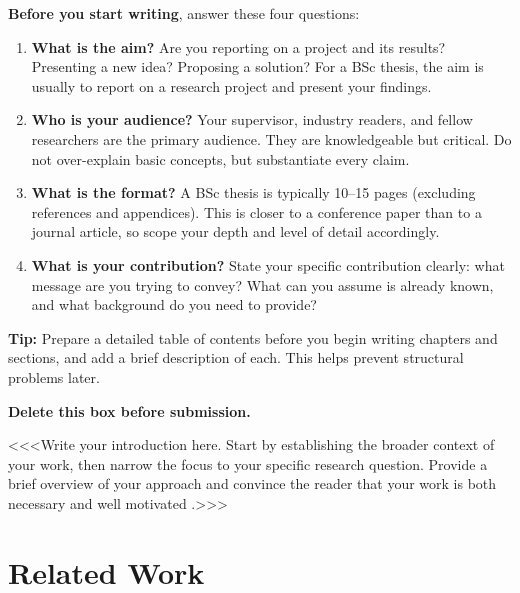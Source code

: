 \documentclass[12pt,a4paper,twocolumn]{article}
\begin{document}
\begin{stylenote}
\textbf{Before you start writing}, answer these four questions:
\begin{enumerate}[leftmargin=*, nosep]
  \item \textbf{What is the aim?} Are you reporting on a project and its
    results? Presenting a new idea? Proposing a solution? For a BSc thesis,
    the aim is usually to report on a research project and present your findings.
  \item \textbf{Who is your audience?} Your supervisor, industry readers,
    and fellow researchers are the primary audience. They are knowledgeable
    but critical. Do not over-explain basic concepts, but substantiate every claim.
  \item \textbf{What is the format?} A BSc thesis is typically 10--15 pages
    (excluding references and appendices). This is closer to a conference paper than to a
    journal article, so scope your depth and level of detail accordingly.
  \item \textbf{What is your contribution?} State your specific
    contribution clearly: what message are you trying to convey? What can
    you assume is already known, and what background do you need to provide?
\end{enumerate}

\textbf{Tip:} Prepare a detailed table of contents before you begin writing
chapters and sections, and add a brief description of each. This helps
prevent structural problems later.

\textbf{Delete this box before submission.}
\end{stylenote}

\noindent
<<<Write your introduction here. Start by establishing the broader context
of your work, then narrow the focus to your specific research question.
Provide a brief overview of your approach and convince the reader that your
work is both necessary and well motivated \cite{brown2020}.>>>


\section{Related Work}
\label{sec:related-work}
\end{document}
